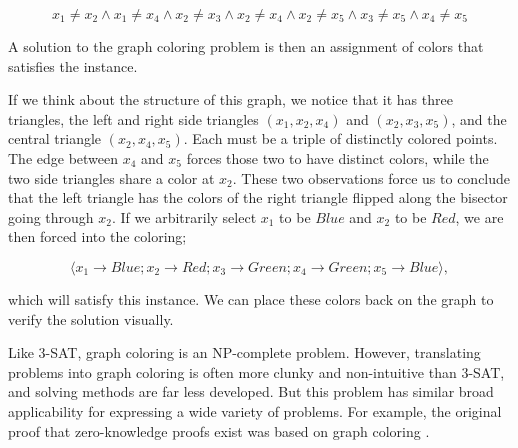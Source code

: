 \begin{equation}
    x_1 \neq x_2 \wedge x_1 \neq x_4 \wedge x_2 \neq x_3 \wedge x_2 \neq x_4 \wedge x_2 \neq x_5 \wedge x_3 \neq x_5 \wedge x_4 \neq x_5
\end{equation}

A solution to the graph coloring problem is then an assignment of colors that satisfies the instance. 

If we think about the structure of this graph, we notice that it has three triangles, the left and right side triangles $(x_1, x_2, x_4)$  and $(x_2, x_3, x_5)$, and the central triangle $(x_2, x_4, x_5)$. Each must be a triple of distinctly colored points. The edge between $x_4$ and $x_5$ forces those two to have distinct colors, while the two side triangles share a color at $x_2$. These two observations force us to conclude that the left triangle has the colors of the right triangle flipped along the bisector going through $x_2$. If we arbitrarily select $x_1$ to be $Blue$ and $x_2$ to be $Red$, we are then forced into the coloring;

\begin{equation}
 \langle x_1 \rightarrow Blue; x_2 \rightarrow Red; x_3 \rightarrow Green; x_4 \rightarrow Green; x_5 \rightarrow Blue\rangle,
\end{equation}

which will satisfy this instance. We can place these colors back on the graph to verify the solution visually.

\begin{center}
\end{center}

Like 3-SAT, graph coloring is an NP-complete problem. However, translating problems into graph coloring is often more clunky and non-intuitive than 3-SAT, and solving methods are far less developed. But this problem has similar broad applicability for expressing a wide variety of problems. For example, the original proof that zero-knowledge proofs exist was based on graph coloring \citep{Numberphile2ZKP}.

